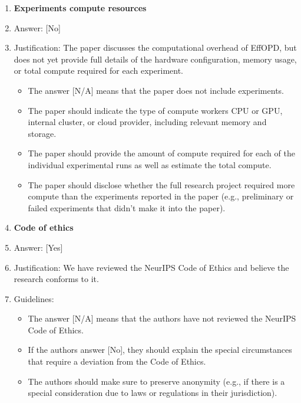 \documentclass{llmxive}
\providecommand{\answerYes}[1][]{[Yes]#1}
\providecommand{\answerNo}[1][]{[No]#1}
\providecommand{\answerNA}[1][]{[N/A]#1}
\begin{document}
\begin{enumerate}
\item {\bf Experiments compute resources}
    \item[] Answer: \answerNo{}
    \item[] Justification: The paper discusses the computational overhead of EffOPD, but does not yet provide full details of the hardware configuration, memory usage, or total compute required for each experiment.
    \begin{itemize}
        \item The answer \answerNA{} means that the paper does not include experiments.
        \item The paper should indicate the type of compute workers CPU or GPU, internal cluster, or cloud provider, including relevant memory and storage.
        \item The paper should provide the amount of compute required for each of the individual experimental runs as well as estimate the total compute. 
        \item The paper should disclose whether the full research project required more compute than the experiments reported in the paper (e.g., preliminary or failed experiments that didn't make it into the paper). 
    \end{itemize}


\item {\bf Code of ethics}
    \item[] Answer: \answerYes{}
    \item[] Justification: We have reviewed the NeurIPS Code of Ethics and believe the research conforms to it.
    \item[] Guidelines:
    \begin{itemize}
        \item The answer \answerNA{} means that the authors have not reviewed the NeurIPS Code of Ethics.
        \item If the authors answer \answerNo, they should explain the special circumstances that require a deviation from the Code of Ethics.
        \item The authors should make sure to preserve anonymity (e.g., if there is a special consideration due to laws or regulations in their jurisdiction).
    \end{itemize}


\end{enumerate}
\end{document}
